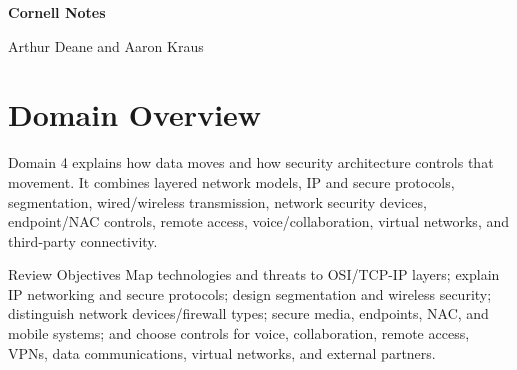 \documentclass[10pt,letterpaper]{article}
\begin{document}
\hypersetup{pageanchor=false}
\begin{titlepage}\pagecolor{navy}\color{white}\vspace{0.25in}{\large Sixth Edition \textbullet\ 2021\par}\vfill{\Huge\bfseries Cornell Notes\par}\vspace{0.25in}{\LARGE Domain 4\par}\vspace{0.08in}{\LARGE\bfseries Communication and Network Security\par}\vfill{\large Arthur Deane and Aaron Kraus\par}\vspace{0.12in}{\normalsize Study and review companion\par}\end{titlepage}
\hypersetup{pageanchor=true}\nopagecolor\color{black}

\section*{\color{navy}Domain Overview}
Domain 4 explains how data moves and how security architecture controls that movement. It combines layered network models, IP and secure protocols, segmentation, wired/wireless transmission, network security devices, endpoint/NAC controls, remote access, voice/collaboration, virtual networks, and third-party connectivity.

\begin{summarybox}{Review Objectives}
Map technologies and threats to OSI/TCP-IP layers; explain IP networking and secure protocols; design segmentation and wireless security; distinguish network devices/firewall types; secure media, endpoints, NAC, and mobile systems; and choose controls for voice, collaboration, remote access, VPNs, data communications, virtual networks, and external partners.
\end{summarybox}
\end{document}
